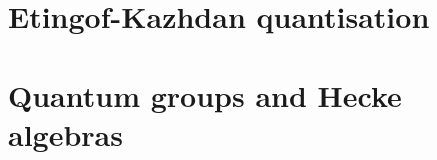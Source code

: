         \chapter{Etingof-Kazhdan quantisation}
            \begin{abstract}
                
            \end{abstract}
            
            \minitoc
        
            

        \chapter{Quantum groups and Hecke algebras}
            \begin{abstract}
                
            \end{abstract}
            
            \minitoc

            

            
	
    \printbibliography

